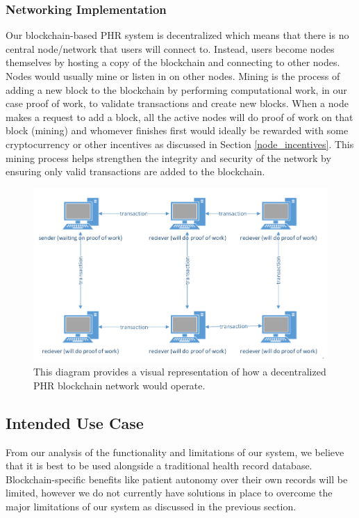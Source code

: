 \documentclass{article}
\begin{document}
\subsubsection{Networking Implementation}
\label{improvements:networking}
Our blockchain-based PHR system is decentralized which means that there is no central node/network that users will connect to. Instead, users become nodes themselves by hosting a copy of the blockchain and connecting to other nodes. Nodes would usually mine or listen in on other nodes. Mining is the process of adding a new block to the blockchain by performing computational work, in our case proof of work, to validate transactions and create new blocks. When a node makes a request to add a block, all the active nodes will do proof of work on that block (mining) and whomever finishes first would ideally be rewarded with some cryptocurrency or other incentives as discussed in Section \ref{node_incentives}. This mining process helps strengthen the integrity and security of the network by ensuring only valid transactions are added to the blockchain.


\begin{figure}[h]
\centering
\includegraphics[width=\textwidth]{images/network.png}
\caption{This diagram provides a visual representation of how a decentralized PHR blockchain network would operate.}
\label{fig:network_diagram}
\end{figure}


\subsection{Intended Use Case}
From our analysis of the functionality and limitations of our system, we believe that it is best to be used alongside a traditional health record database. Blockchain-specific benefits like patient autonomy over their own records will be limited, however we do not currently have solutions in place to overcome the major limitations of our system as discussed in the previous section.
\end{document}
